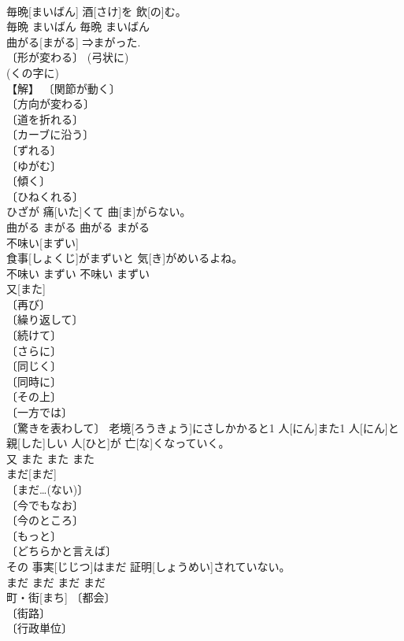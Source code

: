 \documentclass[8pt]{extreport}
\begin{document}
\begin{CJK}{UTF8}{min}
\\	毎晩[まいばん] 酒[さけ]を 飲[の]む。	
\\	毎晩	まいばん	毎晩	まいばん	
\\	曲がる[まがる]	⇒まがった. 
\\	〔形が変わる〕 (弓状に) 
\\	(くの字に) 
\\	【解】 〔関節が動く〕 
\\	〔方向が変わる〕 
\\	〔道を折れる〕 
\\	〔カーブに沿う〕 
\\	〔ずれる〕 
\\	〔ゆがむ〕 
\\	〔傾く〕 
\\	〔ひねくれる〕 
\\	ひざが 痛[いた]くて 曲[ま]がらない。	
\\	曲がる	まがる	曲がる	まがる	
\\	不味い[まずい]	
\\	食事[しょくじ]がまずいと 気[き]がめいるよね。	
\\	不味い	まずい	不味い	まずい	
\\	又[また]	
\\	〔再び〕 
\\	〔繰り返して〕 
\\	〔続けて〕 
\\	〔さらに〕 
\\	〔同じく〕 
\\	〔同時に〕 
\\	〔その上〕 
\\	〔一方では〕 
\\	〔驚きを表わして〕	老境[ろうきょう]にさしかかると1 人[にん]また1 人[にん]と 親[した]しい 人[ひと]が 亡[な]くなっていく。	
\\	又	また	また	また	
\\	まだ[まだ]	
\\	〔まだ…(ない)〕 
\\	〔今でもなお〕 
\\	〔今のところ〕 
\\	〔もっと〕 
\\	〔どちらかと言えば〕 
\\	その 事実[じじつ]はまだ 証明[しょうめい]されていない。	
\\	まだ	まだ	まだ	まだ	
\\	町・街[まち]	〔都会〕 
\\	〔街路〕 
\\	〔行政単位〕 

\end{CJK}
\end{document}
